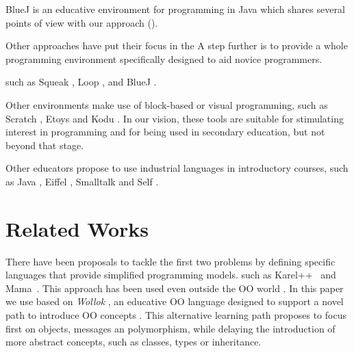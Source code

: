 
BlueJ \cite{bennedsen_bluej_2010} is an educative environment for programming in Java 
which shares several points of view with our approach (\cf {}).




Other approaches have put their focus in the 
A step further is to provide a whole programming environment specifically designed to aid novice programmers.

 
such as Squeak \cite{ingalls_back_1997}, 
Loop \cite{griggio_programming_2011}, 
and BlueJ .

Other environments make use of block-based or visual programming, 
such as Scratch \cite{malan_scratch_2007}, Etoys \cite{lee_empowering_2011} and Kodu \cite{kodu}. 
In our vision, these tools are suitable for stimulating interest in programming and for being used in secondary education, but not beyond that stage.

Other educators propose to use industrial languages in introductory courses, 
such as Java \cite{kolling2001guidelines}, Eiffel \cite{meyer1993towards}, Smalltalk \cite{ducasse2006squeak} and Self \cite{Unga87a}.


\section{Related Works}
\label{sec:related}

There have been proposals to tackle the first two problems by defining specific languages
that provide simplified programming models.
such as Karel++~\cite{bergin_karel++:_1996} and Mama~\cite{harrisonmama}.
This approach has been used even outside the OO world \cite{feurzeig_programming-languages_1970, pattis_karel_1981, lopez_nombre_2012}.
In this paper we use based on \emph{Wollok} \cite{passerini2017wollok}, 
an educative OO language designed to support a novel path to introduce OO concepts \cite{lombardi_instances_2007,lombardi_carlos_alumnos_2008,spigariol_lucas_ensenando_2013}.
This alternative learning path proposes to focus first on objects, messages an polymorphism, 
while delaying the introduction of more abstract concepts, such as classes, types or inheritance.

